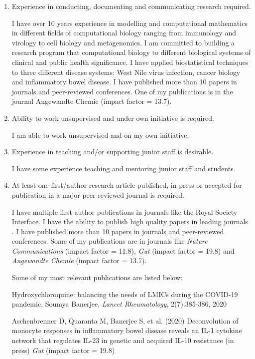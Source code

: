 \documentclass[10pt]{article}
\begin{document}
\begin{enumerate}

\item Experience in conducting, documenting and communicating research required.

I have over 10 years experience in modelling and computational mathematics in different fields of computational biology ranging from immunology and virology to cell biology and metagenomics. I am committed to building a research program that computational biology to different biological systems of clinical and public health significance.
 I have applied biostatistical techniques to three different disease systems: West Nile virus infection, cancer biology and inflammatory bowel disease. I have published more than 10 papers in journals and peer-reviewed conferences. One of my publications is in the journal Angewandte Chemie (impact factor = 13.7).


\item Ability to work unsupervised and under own initiative is required.

I am able to work unsupervised and on my own initiative.


\item Experience in teaching and/or supporting junior staff is desirable.

I have some experience teaching and mentoring junior staff and students.


\item At least one first/author research article published, in press or accepted for publication in a major peer-reviewed journal is required.


I have multiple first author publications in journals like the Royal Society Interface. I have the ability to publish high quality papers in leading journals \cite{Banerjee2018d,Banerjee2017g,Banerjee2016,Liu2014a,Mallick2019,Graessl2017,Banerjee2020d,Aschenbrenner2020}. I have published more than 10 papers in journals and peer-reviewed conferences. Some of my publications are in journals like \textit{Nature Communications} (impact factor = 11.8), \textit{Gut} (impact factor = 19.8) and \textit{Angewandte Chemie} (impact factor = 13.7). 

Some of my most relevant publications are listed below:

Hydroxychloroquine: balancing the needs of LMICs during the COVID-19 pandemic, Soumya Banerjee, \textit{Lancet Rheumatology}, 2(7):385-386, 2020

Aschenbrenner D, Quaranta M, Banerjee S,  et al. (2020) Deconvolution of monocyte responses in inflammatory bowel disease reveals an IL-1 cytokine network that regulates IL-23 in genetic and acquired IL-10 resistance (in press) \textit{Gut} (impact factor = 19.8)


\end{enumerate}
\end{document}
